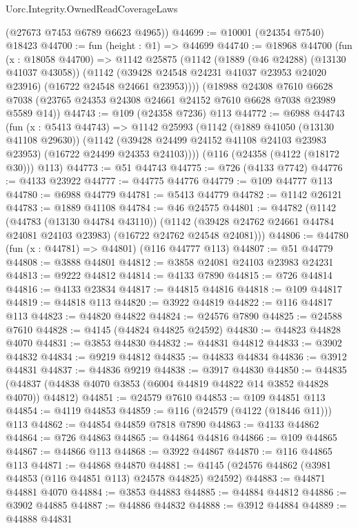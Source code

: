 \begin{lexlean}{Uorc.Integrity.OwnedReadCoverageLaws}
\begin{coremodule}
      (@27673 @7453 @6789 @6623 @4965))
@44699 := @10001 (@24354 @7540) @18423
@44700 := fun (height : @1) => @44699
@44740 := @18968
    @44700
    (fun (x : @18058 @44700) =>
    @1142
      @25875
      (@1142
        (@1889 (@46 @24288) (@13130 @41037 @43058))
        (@1142 (@39428 @24548 @24231 @41037 @23953 @24020 @23916) (@16722 @24548 @24661 @23953))))
    (@18988
      @24308
      @7610
      @6628
      @7038
      (@23765 @24353 @24308 @24661 @24152 @7610 @6628 @7038 @23989 @5589 @14))
@44743 := @109 (@24358 @7236) @113
@44772 := @6988
    @44743
    (fun (x : @5413 @44743) =>
    @1142
      @25993
      (@1142
        (@1889 @41050 (@13130 @41108 @29630))
        (@1142 (@39428 @24499 @24152 @41108 @24103 @23983 @23953) (@16722 @24499 @24353 @24103))))
    (@116 (@24358 (@4122 (@18172 @30))) @113)
@44773 := @51 @44743
@44775 := @726 (@4133 @7742)
@44776 := @4133 @23922
@44777 := @44775 @44776
@44779 := @109 @44777 @113
@44780 := @6988 @44779
@44781 := @5413 @44779
@44782 := @1142 @26121
@44783 := @1889 @41108
@44784 := @46 @24575
@44801 := @44782
    (@1142
      (@44783 (@13130 @44784 @43110))
      (@1142 (@39428 @24762 @24661 @44784 @24081 @24103 @23983) (@16722 @24762 @24548 @24081)))
@44806 := @44780 (fun (x : @44781) => @44801) (@116 @44777 @113)
@44807 := @51 @44779
@44808 := @3888 @44801
@44812 := @3858 @24081 @24103 @23983 @24231
@44813 := @9222 @44812
@44814 := @4133 @7890
@44815 := @726 @44814
@44816 := @4133 @23834
@44817 := @44815 @44816
@44818 := @109 @44817
@44819 := @44818 @113
@44820 := @3922 @44819
@44822 := @116 @44817 @113
@44823 := @44820 @44822
@44824 := @24576 @7890
@44825 := @24588 @7610
@44828 := @4145 (@44824 @44825 @24592)
@44830 := @44823 @44828 @4070
@44831 := @3853 @44830
@44832 := @44831 @44812
@44833 := @3902 @44832
@44834 := @9219 @44812
@44835 := @44833 @44834
@44836 := @3912 @44831
@44837 := @44836 @9219
@44838 := @3917 @44830
@44850 := @44835 (@44837 (@44838 @4070 @3853 (@6004 @44819 @44822 @14 @3852 @44828 @4070)) @44812)
@44851 := @24579 @7610
@44853 := @109 @44851 @113
@44854 := @4119 @44853
@44859 := @116 (@24579 (@4122 (@18446 @11))) @113
@44862 := @44854 @44859 @7818 @7890
@44863 := @4133 @44862
@44864 := @726 @44863
@44865 := @44864 @44816
@44866 := @109 @44865
@44867 := @44866 @113
@44868 := @3922 @44867
@44870 := @116 @44865 @113
@44871 := @44868 @44870
@44881 := @4145 (@24576 @44862 (@3981 @44853 (@116 @44851 @113) @24578 @44825) @24592)
@44883 := @44871 @44881 @4070
@44884 := @3853 @44883
@44885 := @44884 @44812
@44886 := @3902 @44885
@44887 := @44886 @44832
@44888 := @3912 @44884
@44889 := @44888 @44831

\end{coremodule}
\end{lexlean}
